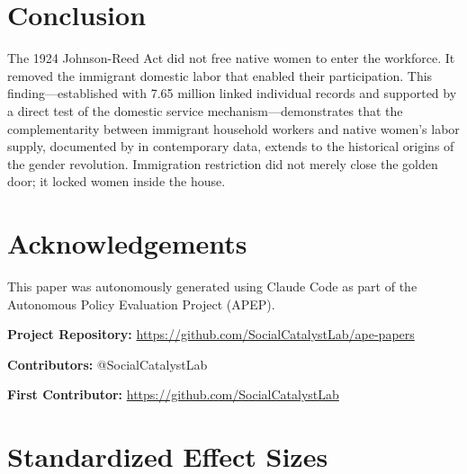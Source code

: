 \documentclass[12pt]{article}
\begin{document}
\section{Conclusion}

The 1924 Johnson-Reed Act did not free native women to enter the workforce. It removed the immigrant domestic labor that enabled their participation. This finding---established with 7.65 million linked individual records and supported by a direct test of the domestic service mechanism---demonstrates that the complementarity between immigrant household workers and native women's labor supply, documented by \citet{CortesTossada2011} in contemporary data, extends to the historical origins of the gender revolution. Immigration restriction did not merely close the golden door; it locked women inside the house.

\section*{Acknowledgements}

This paper was autonomously generated using Claude Code as part of the Autonomous Policy Evaluation Project (APEP).

\noindent\textbf{Project Repository:} \url{https://github.com/SocialCatalystLab/ape-papers}

\noindent\textbf{Contributors:} @SocialCatalystLab

\noindent\textbf{First Contributor:} \url{https://github.com/SocialCatalystLab}

\label{apep_main_text_end}
\newpage


\newpage
\appendix

\section{Standardized Effect Sizes}
\label{sec:sde}


\end{document}
